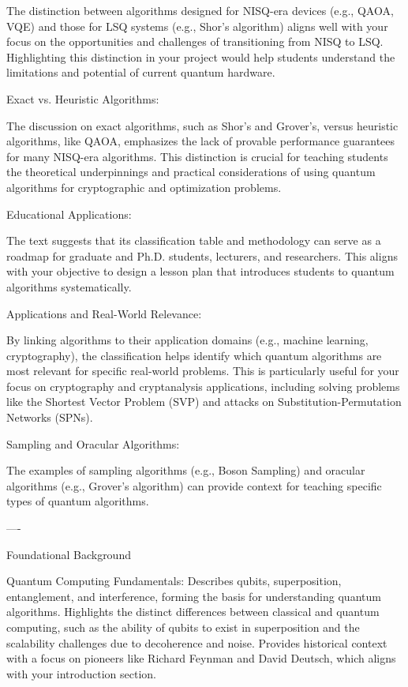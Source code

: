     The distinction between algorithms designed for NISQ-era devices (e.g., QAOA, VQE) and those for LSQ systems (e.g., Shor’s algorithm) aligns well with your focus on the opportunities and challenges of transitioning from NISQ to LSQ.
    Highlighting this distinction in your project would help students understand the limitations and potential of current quantum hardware.

Exact vs. Heuristic Algorithms:

    The discussion on exact algorithms, such as Shor’s and Grover’s, versus heuristic algorithms, like QAOA, emphasizes the lack of provable performance guarantees for many NISQ-era algorithms.
    This distinction is crucial for teaching students the theoretical underpinnings and practical considerations of using quantum algorithms for cryptographic and optimization problems.

Educational Applications:

    The text suggests that its classification table and methodology can serve as a roadmap for graduate and Ph.D. students, lecturers, and researchers. This aligns with your objective to design a lesson plan that introduces students to quantum algorithms systematically.

Applications and Real-World Relevance:

    By linking algorithms to their application domains (e.g., machine learning, cryptography), the classification helps identify which quantum algorithms are most relevant for specific real-world problems.
    This is particularly useful for your focus on cryptography and cryptanalysis applications, including solving problems like the Shortest Vector Problem (SVP) and attacks on Substitution-Permutation Networks (SPNs).


    Sampling and Oracular Algorithms:

    The examples of sampling algorithms (e.g., Boson Sampling) and oracular algorithms (e.g., Grover’s algorithm) can provide context for teaching specific types of quantum algorithms.

    
    ----


    Foundational Background

    Quantum Computing Fundamentals:
        Describes qubits, superposition, entanglement, and interference, forming the basis for understanding quantum algorithms.
        Highlights the distinct differences between classical and quantum computing, such as the ability of qubits to exist in superposition and the scalability challenges due to decoherence and noise.
        Provides historical context with a focus on pioneers like Richard Feynman and David Deutsch, which aligns with your introduction section.

